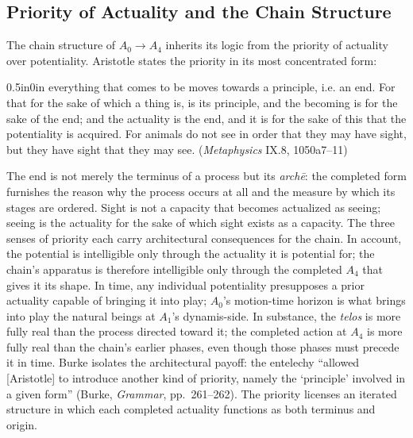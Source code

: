 \subsection{Priority of Actuality and the Chain Structure}

The chain structure of $A_0 \rightarrow A_4$ inherits its logic from the priority of actuality over potentiality. Aristotle states the priority in its most concentrated form:
\begin{adjustwidth}{0.5in}{0in}
everything that comes to be moves towards a principle, i.e. an end. For that for the sake of which a thing is, is its principle, and the becoming is for the sake of the end; and the actuality is the end, and it is for the sake of this that the potentiality is acquired. For animals do not see in order that they may have sight, but they have sight that they may see. (\textit{Metaphysics} IX.8, 1050a7--11)
\end{adjustwidth}
The end is not merely the terminus of a process but its \textit{archē}: the completed form furnishes the reason why the process occurs at all and the measure by which its stages are ordered. Sight is not a capacity that becomes actualized as seeing; seeing is the actuality for the sake of which sight exists as a capacity. The three senses of priority each carry architectural consequences for the chain. In account, the potential is intelligible only through the actuality it is potential for; the chain's apparatus is therefore intelligible only through the completed $A_4$ that gives it its shape. In time, any individual potentiality presupposes a prior actuality capable of bringing it into play; $A_0$'s motion-time horizon is what brings into play the natural beings at $A_1$'s dynamis-side. In substance, the \textit{telos} is more fully real than the process directed toward it; the completed action at $A_4$ is more fully real than the chain's earlier phases, even though those phases must precede it in time. Burke isolates the architectural payoff: the entelechy ``allowed [Aristotle] to introduce another kind of priority, namely the `principle' involved in a given form'' (Burke, \textit{Grammar}, pp.~261--262). The priority licenses an iterated structure in which each completed actuality functions as both terminus and origin.

